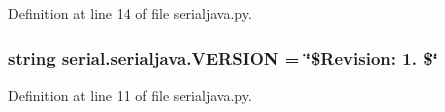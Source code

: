 Definition at line 14 of file serialjava.\+py.

\subsubsection[{\texorpdfstring{V\+E\+R\+S\+I\+ON}{VERSION}}]{\setlength{\rightskip}{0pt plus 5cm}string serial.\+serialjava.\+V\+E\+R\+S\+I\+ON = \char`\"{}\$Revision\+: 1. \$\char`\"{}}\hypertarget{namespaceserial_1_1serialjava_a1d2a0a1a3b62ea93a1f5177204977a29}{}\label{namespaceserial_1_1serialjava_a1d2a0a1a3b62ea93a1f5177204977a29}


Definition at line 11 of file serialjava.\+py.

